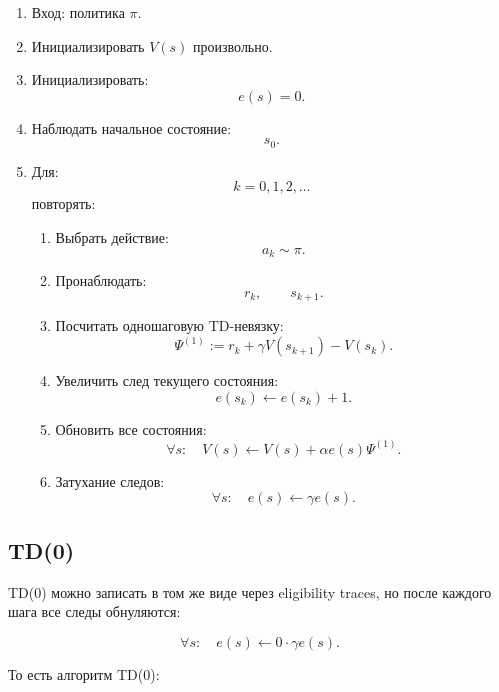 \documentclass[12pt,a4paper]{article}
\begin{document}
\begin{enumerate}
    \item Вход: политика $\pi$.

    \item Инициализировать $V(s)$ произвольно.

    \item Инициализировать:
    \[
    e(s)=0.
    \]

    \item Наблюдать начальное состояние:
    \[
    s_0.
    \]

    \item Для:
    \[
    k=0,1,2,\ldots
    \]
    повторять:
    \begin{enumerate}
        \item Выбрать действие:
        \[
        a_k\sim\pi.
        \]

        \item Пронаблюдать:
        \[
        r_k,
        \qquad
        s_{k+1}.
        \]

        \item Посчитать одношаговую TD-невязку:
        \[
        \Psi^{(1)}
        :=
        r_k+\gamma V(s_{k+1})-V(s_k).
        \]

        \item Увеличить след текущего состояния:
        \[
        e(s_k)
        \leftarrow
        e(s_k)+1.
        \]

        \item Обновить все состояния:
        \[
        \forall s:
        \quad
        V(s)
        \leftarrow
        V(s)
        +
        \alpha e(s)\Psi^{(1)}.
        \]

        \item Затухание следов:
        \[
        \forall s:
        \quad
        e(s)
        \leftarrow
        \gamma e(s).
        \]
    \end{enumerate}
\end{enumerate}

\subsection{TD(0)}

TD(0) можно записать в том же виде через eligibility traces, но после каждого шага все следы обнуляются:

\[
\forall s:
\quad
e(s)
\leftarrow
0\cdot\gamma e(s).
\]

То есть алгоритм TD(0):
\end{document}
